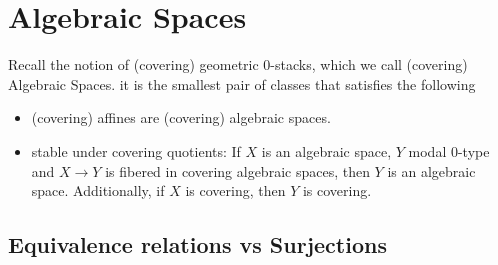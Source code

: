 \section{Algebraic Spaces}
Recall the notion of (covering) geometric 0-stacks, which we call (covering) Algebraic Spaces. it is the smallest pair of classes that satisfies the following
\begin{itemize}
	\item (covering) affines are (covering) algebraic spaces. %
	\item stable under covering quotients: If $X$ is an algebraic space, $Y$ modal 0-type and $X \to Y$ is fibered in covering algebraic spaces, then $Y$ is an algebraic space. Additionally, if $X$ is covering, then $Y$ is covering.
\end{itemize}
\subsection{Equivalence relations vs Surjections}

